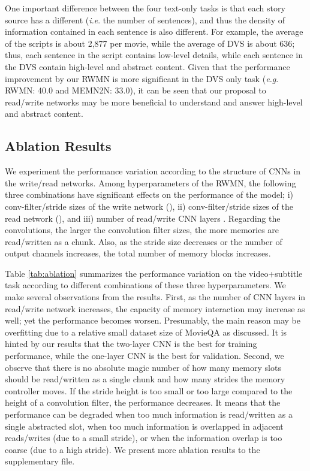 \documentclass[10pt,twocolumn,letterpaper]{article}
\makeatletter
\theoremstyle{nonumberplain}
\DeclareRobustCommand\onedot{\futurelet\@let@token\@onedot}
\def\onedot{.\@\xspace}
\def\eg{\emph{e.g}\onedot} \def\Eg{\emph{E.g}\onedot}
\def\ie{\emph{i.e}\onedot} \def\Ie{\emph{I.e}\onedot}
\makeatother
\begin{document}
One important difference between the four text-only tasks is that each story source has a different  (\ie the number of sentences), 
and thus the density of information contained in each sentence is also different. 
For example, the average  of the scripts is about 2,877 per movie, while the average  of DVS is about 636;
thus, each sentence in the script contains low-level details, while each sentence in the DVS contain high-level and abstract content. 
Given that the performance improvement by our RWMN is more significant in the DVS only task 
(\eg RWMN: 40.0 and MEMN2N: 33.0), 
it can be seen that our proposal to read/write networks may be more beneficial to understand and answer high-level and abstract content. 









\subsection{Ablation Results}
\label{sec:ablation_results}

We experiment the performance variation according to the structure of CNNs in the write/read networks.
Among hyperparameters of the RWMN, the following three combinations have significant effects on the performance of the model;
i) conv-filter/stride sizes of the write network (), ii) conv-filter/stride sizes of the read network (), and iii) number of read/write CNN layers .
Regarding the convolutions, the larger the convolution filter sizes, the more memories are read/written as a chunk.
Also, as the stride size decreases or the number of output channels increases, the total number of memory blocks increases.

Table \ref{tab:ablation} summarizes the performance variation on the video+subtitle task according to different combinations of these three hyperparameters. 
We make several observations from the results.
First, as the number of CNN layers in read/write network increases, the capacity of memory interaction may increase as well; yet the performance becomes worsen. 
Presumably, the main reason may be overfitting due to a  relative small dataset size of MovieQA as discussed. 
It is hinted by our results that the two-layer CNN is the best for training performance, while the one-layer CNN is the best for validation. 
Second, we observe that there is no absolute magic number of how many memory slots should be read/written as a single chunk and how many strides the memory controller moves. 
If the stride height is too small or too large compared to the height of a convolution filter, the performance decreases. 
It means that the performance can be degraded when too much information is read/written as a single abstracted slot, when too much information is overlapped in adjacent reads/writes (due to a small stride), or when the information overlap is too coarse (due to a high stride). 
We present more ablation results to the supplementary file.  
\end{document}
